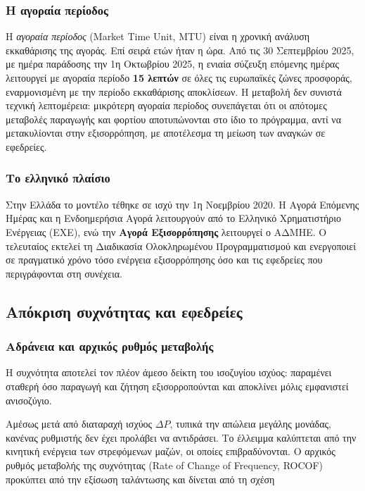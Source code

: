 \subsubsection*{Η αγοραία περίοδος}

Η \emph{αγοραία περίοδος} (Market Time Unit, MTU) είναι η χρονική ανάλυση εκκαθάρισης της
αγοράς. Επί σειρά ετών ήταν η ώρα. Από τις 30 Σεπτεμβρίου 2025, με ημέρα παράδοσης την 1η
Οκτωβρίου 2025, η ενιαία σύζευξη επόμενης ημέρας λειτουργεί με αγοραία περίοδο
\textbf{15 λεπτών} σε όλες τις ευρωπαϊκές ζώνες προσφοράς, εναρμονισμένη με την περίοδο
εκκαθάρισης αποκλίσεων. Η μεταβολή δεν συνιστά τεχνική λεπτομέρεια: μικρότερη αγοραία
περίοδος συνεπάγεται ότι οι απότομες μεταβολές παραγωγής και φορτίου αποτυπώνονται στο ίδιο
το πρόγραμμα, αντί να μετακυλίονται στην εξισορρόπηση, με αποτέλεσμα τη μείωση των αναγκών
σε εφεδρείες.

\subsubsection*{Το ελληνικό πλαίσιο}

Στην Ελλάδα το μοντέλο τέθηκε σε ισχύ την 1η Νοεμβρίου 2020. Η Αγορά Επόμενης Ημέρας και η
Ενδοημερήσια Αγορά λειτουργούν από το Ελληνικό Χρηματιστήριο Ενέργειας (ΕΧΕ), ενώ την
\textbf{Αγορά Εξισορρόπησης} λειτουργεί ο ΑΔΜΗΕ. Ο τελευταίος εκτελεί τη Διαδικασία
Ολοκληρωμένου Προγραμματισμού και ενεργοποιεί σε πραγματικό χρόνο τόσο ενέργεια
εξισορρόπησης όσο και τις εφεδρείες που περιγράφονται στη συνέχεια.

\subsection{Απόκριση συχνότητας και εφεδρείες}

\subsubsection*{Αδράνεια και αρχικός ρυθμός μεταβολής}

Η συχνότητα αποτελεί τον πλέον άμεσο δείκτη του ισοζυγίου ισχύος: παραμένει σταθερή όσο
παραγωγή και ζήτηση εξισορροπούνται και αποκλίνει μόλις εμφανιστεί ανισοζύγιο.

Αμέσως μετά από διαταραχή ισχύος $\Delta P$, τυπικά την απώλεια μεγάλης μονάδας, κανένας
ρυθμιστής δεν έχει προλάβει να αντιδράσει. Το έλλειμμα καλύπτεται από την κινητική ενέργεια
των στρεφόμενων μαζών, οι οποίες επιβραδύνονται. Ο αρχικός ρυθμός μεταβολής της συχνότητας
(Rate of Change of Frequency, ROCOF) προκύπτει από την εξίσωση ταλάντωσης και δίνεται από
τη σχέση

